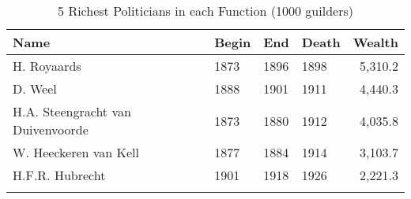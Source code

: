\begin{table}[ht]
\begin{tabular}{llllr}
Name & Begin & End & Death & Wealth \\\hline
H. Royaards & 1873 & 1896 & 1898 & 5,310.2 \\
  D. Weel & 1888 & 1901 & 1911 & 4,440.3 \\
  H.A. Steengracht van Duivenvoorde & 1873 & 1880 & 1912 & 4,035.8 \\
  W. Heeckeren van Kell & 1877 & 1884 & 1914 & 3,103.7 \\
  H.F.R. Hubrecht & 1901 & 1918 & 1926 & 2,221.3 \\
   \hline
\multicolumn{5}{l}{}\\
\end{tabular}
\caption{5 Richest Politicians in each Function (1000 guilders)}
\label{tab:richestpols}
\end{table}
